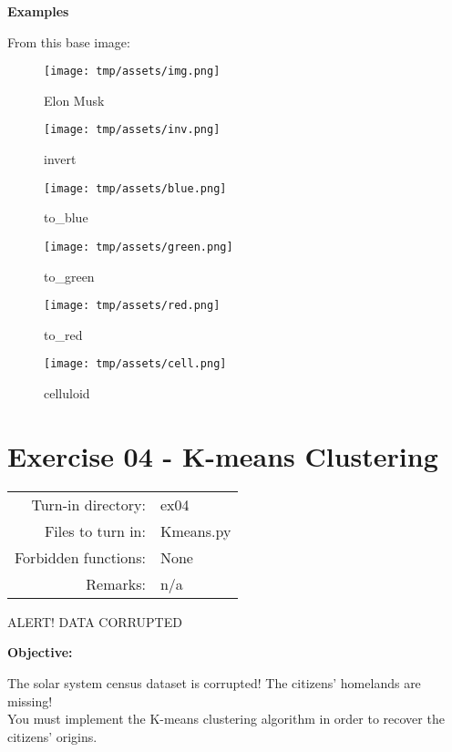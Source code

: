 \documentclass[]{article}
\begin{document}
\textbf{Examples}

From this base image:

\begin{figure}
\centering
\texttt{[image: tmp/assets/img.png]}
\caption{Elon Musk}
\end{figure}

\begin{figure}
\centering
\texttt{[image: tmp/assets/inv.png]}
\caption{invert}
\end{figure}

\begin{figure}
\centering
\texttt{[image: tmp/assets/blue.png]}
\caption{to\_blue}
\end{figure}

\begin{figure}
\centering
\texttt{[image: tmp/assets/green.png]}
\caption{to\_green}
\end{figure}

\begin{figure}
\centering
\texttt{[image: tmp/assets/red.png]}
\caption{to\_red}
\end{figure}

\begin{figure}
\centering
\texttt{[image: tmp/assets/cell.png]}
\caption{celluloid}
\end{figure}

\clearpage

\hypertarget{exercise-04---k-means-clustering-1}{%
\section{Exercise 04 - K-means
Clustering}\label{exercise-04---k-means-clustering-1}}

\begin{longtable}[]{@{}rl@{}}
\toprule
\endhead
Turn-in directory: & ex04\tabularnewline
Files to turn in: & Kmeans.py\tabularnewline
Forbidden functions: & None\tabularnewline
Remarks: & n/a\tabularnewline
\bottomrule
\end{longtable}

ALERT! DATA CORRUPTED

\textbf{Objective:}

The solar system census dataset is corrupted! The citizens' homelands
are missing!\\
You must implement the K-means clustering algorithm in order to recover
the citizens' origins.
\end{document}
